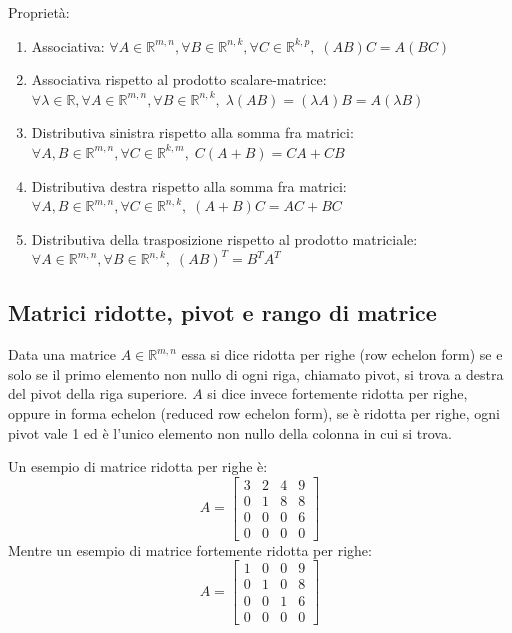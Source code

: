 \documentclass{article}
\begin{document}
    \vspace{10pt}
    Proprietà:
    \begin{enumerate}[label=(\arabic*)]
        \item Associativa: $\forall A \in \mathbb{R}^{m, n}, \forall B \in \mathbb{R}^{n, k}, \forall C \in \mathbb{R}^{k, p}, \; (AB) C = A (BC)$ 
        \item Associativa rispetto al prodotto scalare-matrice: $\forall \lambda \in \mathbb{R}, \forall A \in \mathbb{R}^{m, n}, \forall B \in \mathbb{R}^{n, k}, \; \lambda (A  B) = (\lambda A)  B = A  (\lambda B)$
        \item Distributiva sinistra rispetto alla somma fra matrici: $\forall A, B \in \mathbb{R}^{m, n}, \forall C \in \mathbb{R}^{k, m}, \; C (A + B) = C  A + C  B$
        \item Distributiva destra rispetto alla somma fra matrici: $\forall A, B \in \mathbb{R}^{m, n}, \forall C \in \mathbb{R}^{n, k}, \; (A + B) C = AC + BC$
        \item Distributiva della trasposizione rispetto al prodotto matriciale: $\forall A \in \mathbb{R}^{m, n}, \forall B \in \mathbb{R}^{n, k}, \; (A  B)^{T} = B^{T}  A^{T}$
    \end{enumerate}

\subsection{Matrici ridotte, pivot e rango di matrice} \label{subsec:matrank}
    Data una matrice $A \in \mathbb{R}^{m, n}$ essa si dice ridotta per righe (row echelon form) se e solo se il primo elemento non nullo
    di ogni riga, chiamato pivot, si trova a destra del pivot della riga superiore. $A$ si dice invece fortemente ridotta per righe,
    oppure in forma echelon (reduced row echelon form), se è ridotta per righe, ogni pivot vale 1 ed è l'unico elemento non nullo della colonna in cui si trova. 

    \vspace{10pt}
    Un esempio di matrice ridotta per righe è:
    \[
        A = 
        \begin{bmatrix}
            3 & 2 & 4 & 9 \\
            0 & 1 & 8 & 8 \\
            0 & 0 & 0 & 6 \\
            0 & 0 & 0 & 0 
        \end{bmatrix} 
    \]
    Mentre un esempio di matrice fortemente ridotta per righe: 
    \[
        A = 
        \begin{bmatrix}
            1 & 0 & 0 & 9 \\
            0 & 1 & 0 & 8 \\
            0 & 0 & 1 & 6 \\
            0 & 0 & 0 & 0 
        \end{bmatrix} 
    \]
\end{document}
